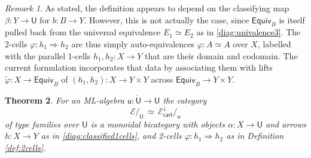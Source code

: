 \documentclass[12pt,reqno]{amsart}
\newcommand{\EE}{\ensuremath{\mathcal{E}}}
\renewcommand{\to}{\ensuremath{\rightarrow}}
\renewcommand{\t}{\ensuremath{\mathsf{u}}}
\newcommand{\T}{\ensuremath{\mathsf{U}}}
\newcommand{\TT}{\ensuremath{\dot{\mathsf{U}}}}
\newtheorem{theorem}{Theorem}
\newtheorem{lemma}[theorem]{Lemma}
\theoremstyle{remark}
\newtheorem{remark}[theorem]{Remark}
\theoremstyle{definition}
\begin{document}
\begin{remark}\label{2cellsareglobal}
As stated, the definition appears to depend on the classifying map $\beta : Y\to \T$ for $b:B\to Y$. However,  this is not actually the case,
since $\mathsf{Equiv}_B$ is itself pulled back from the universal equivalence $E_1\simeq E_2$ as in \eqref{diag:univalence3}.  The 2-cells $\varphi : h_1 \Rightarrow h_2$ are thus simply auto-equivalences $\varphi: A \simeq A$ over $X$, labelled with the parallel 1-cells $h_1, h_2 : X \to Y$ that are their domain and codomain. The current formulation incorporates that data by associating them with lifts $\tilde{\varphi} : X \to \mathsf{Equiv}_B$ of $(h_1, h_2) : X \to Y \times Y$ across $\mathsf{Equiv}_B \to Y\times Y$. 
\end{remark}

%
% 
 
\begin{theorem}\label{thm:MLAlgbicat}
For an ML-algebra $\t : \TT \to \T$ the category $$\EE/_\T\, \simeq\, \EE^{\downarrow}_{\mathsf{cart}}/_{\t}$$ of type families over $\T$ is a monoidal bicategory with objects $\alpha : X\to \T$ and arrows $h : X \to Y$ as in \eqref{diag:classified1cells}, and 2-cells $\varphi : h_1 \Rightarrow h_2$ as in Definition \ref{def:2cells}.  
\end{theorem}
\end{document}

